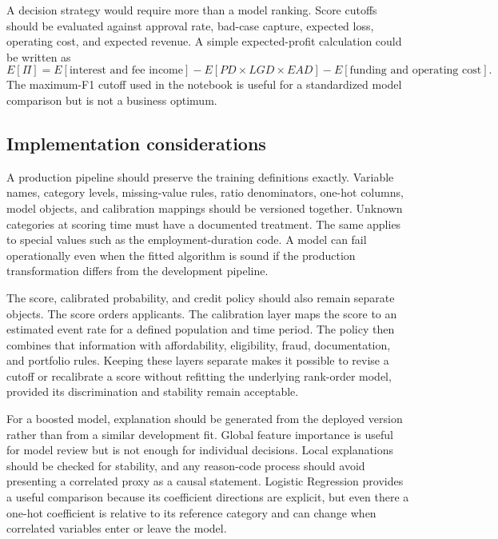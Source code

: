 \documentclass[11pt]{article}
\begin{document}
A decision strategy would require more than a model ranking. Score cutoffs should be evaluated against approval rate, bad-case capture, expected loss, operating cost, and expected revenue. A simple expected-profit calculation could be written as
\begin{equation}
E[\Pi]=E[\text{interest and fee income}]-E[PD\times LGD\times EAD]-E[\text{funding and operating cost}].
\end{equation}
The maximum-F1 cutoff used in the notebook is useful for a standardized model comparison but is not a business optimum.

\subsection{Implementation considerations}
A production pipeline should preserve the training definitions exactly. Variable names, category levels, missing-value rules, ratio denominators, one-hot columns, model objects, and calibration mappings should be versioned together. Unknown categories at scoring time must have a documented treatment. The same applies to special values such as the employment-duration code. A model can fail operationally even when the fitted algorithm is sound if the production transformation differs from the development pipeline.

The score, calibrated probability, and credit policy should also remain separate objects. The score orders applicants. The calibration layer maps the score to an estimated event rate for a defined population and time period. The policy then combines that information with affordability, eligibility, fraud, documentation, and portfolio rules. Keeping these layers separate makes it possible to revise a cutoff or recalibrate a score without refitting the underlying rank-order model, provided its discrimination and stability remain acceptable.

For a boosted model, explanation should be generated from the deployed version rather than from a similar development fit. Global feature importance is useful for model review but is not enough for individual decisions. Local explanations should be checked for stability, and any reason-code process should avoid presenting a correlated proxy as a causal statement. Logistic Regression provides a useful comparison because its coefficient directions are explicit, but even there a one-hot coefficient is relative to its reference category and can change when correlated variables enter or leave the model.
\end{document}
